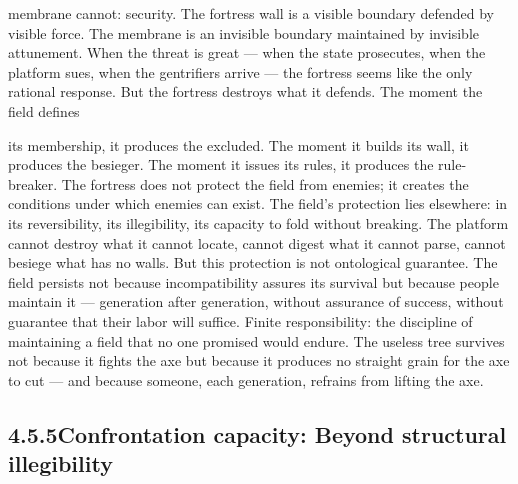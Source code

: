 membrane cannot: security. The fortress wall is a visible boundary defended by visible force. The membrane is an invisible boundary maintained by invisible attunement. When the threat is great — when the state prosecutes, when the platform sues, when the gentrifiers arrive — the fortress seems like the only rational response. But the fortress destroys what it defends. The moment the field defines

its membership, it produces the excluded. The moment it builds its wall, it produces the besieger. The moment it issues its rules, it produces the rule-breaker. The fortress does not protect the field from enemies; it creates the conditions under which enemies can exist. The field’s protection lies elsewhere: in its reversibility, its illegibility, its capacity to fold without breaking. The platform cannot destroy what it cannot locate, cannot digest what it cannot parse, cannot besiege what has no walls. But this protection is not ontological guarantee. The field persists not because incompatibility assures its survival but because people maintain it — generation after generation, without assurance of success, without guarantee that their labor will suffice. Finite responsibility: the discipline of maintaining a field that no one promised would endure. The useless tree survives not because it fights the axe but because it produces no straight grain for the axe to cut — and because someone, each generation, refrains from lifting the axe.

\subsection{4.5.5\quad Confrontation capacity: Beyond structural illegibility}


